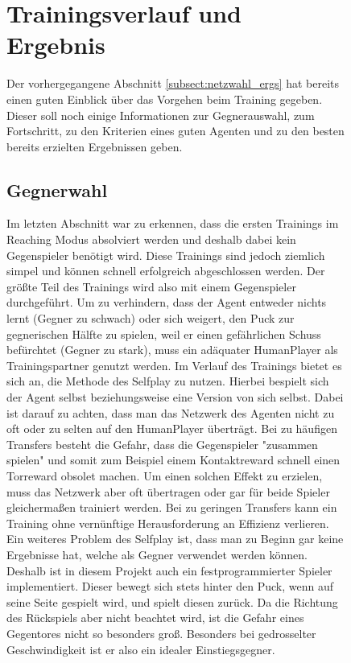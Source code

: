 \begin{figure}[h]
\section{Trainingsverlauf und Ergebnis}
\label{sect:training_erg}

Der vorhergegangene Abschnitt \ref{subsect:netzwahl_ergs} hat bereits einen guten Einblick über das Vorgehen beim Training gegeben. Dieser soll noch einige Informationen zur Gegnerauswahl, zum Fortschritt, zu den Kriterien eines guten Agenten und zu den besten bereits erzielten Ergebnissen geben.

\subsection{Gegnerwahl}
\label{subsect:gegner}

Im letzten Abschnitt war zu erkennen, dass die ersten Trainings im Reaching Modus absolviert werden und deshalb dabei kein Gegenspieler benötigt wird. Diese Trainings sind jedoch ziemlich simpel und können schnell erfolgreich abgeschlossen werden. Der größte Teil des Trainings wird also mit einem Gegenspieler durchgeführt. Um zu verhindern, dass der Agent entweder nichts lernt (Gegner zu schwach) oder sich weigert, den Puck zur gegnerischen Hälfte zu spielen, weil er einen gefährlichen Schuss befürchtet (Gegner zu stark), muss ein adäquater HumanPlayer als Trainingspartner genutzt werden. Im Verlauf des Trainings bietet es sich an, die Methode des Selfplay zu nutzen. Hierbei bespielt sich der Agent selbst beziehungsweise eine Version von sich selbst. Dabei ist darauf zu achten, dass man das Netzwerk des Agenten nicht zu oft oder zu selten auf den HumanPlayer überträgt. Bei zu häufigen Transfers besteht die Gefahr, dass die Gegenspieler "zusammen spielen" und somit zum Beispiel einem Kontaktreward schnell einen Torreward obsolet machen. Um einen solchen Effekt zu erzielen, muss das Netzwerk aber oft übertragen oder gar für beide Spieler gleichermaßen trainiert werden. Bei zu geringen Transfers kann ein Training ohne vernünftige Herausforderung an Effizienz verlieren. Ein weiteres Problem des Selfplay ist, dass man zu Beginn gar keine Ergebnisse hat, welche als Gegner verwendet werden können. Deshalb ist in diesem Projekt auch ein festprogrammierter Spieler implementiert. Dieser bewegt sich stets hinter den Puck, wenn auf seine Seite gespielt wird, und spielt diesen zurück. Da die Richtung des Rückspiels aber nicht beachtet wird, ist die Gefahr eines Gegentores nicht so besonders groß. Besonders bei gedrosselter Geschwindigkeit ist er also ein idealer Einstiegsgegner.
\end{figure}
